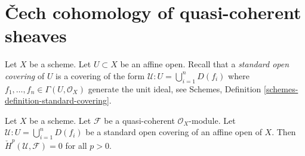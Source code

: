 \section{{\v C}ech cohomology of quasi-coherent sheaves}
\label{section-cech-quasi-coherent}

\noindent
Let $X$ be a scheme.
Let $U \subset X$ be an affine open.
Recall that a {\it standard open covering} of $U$ is a covering
of the form $\mathcal{U} : U = \bigcup_{i = 1}^n D(f_i)$
where $f_1, \ldots, f_n \in \Gamma(U, \mathcal{O}_X)$ generate
the unit ideal, see
Schemes, Definition \ref{schemes-definition-standard-covering}.

\begin{lemma}
\label{lemma-cech-cohomology-quasi-coherent-trivial}
Let $X$ be a scheme.
Let $\mathcal{F}$ be a quasi-coherent $\mathcal{O}_X$-module.
Let $\mathcal{U} : U = \bigcup_{i = 1}^n D(f_i)$ be a standard
open covering of an affine open of $X$.
Then $\check{H}^p(\mathcal{U}, \mathcal{F}) = 0$ for
all $p > 0$.
\end{lemma}

